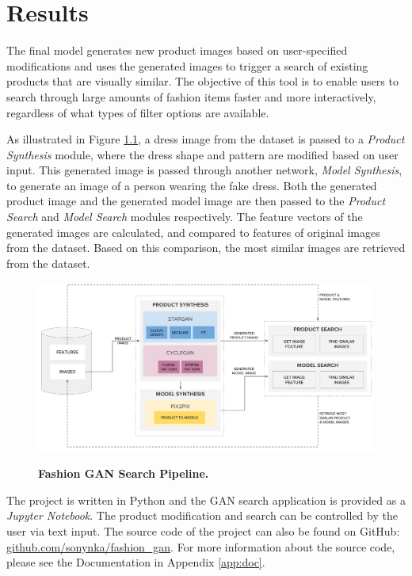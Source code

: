 \documentclass[12pt]{report}
\begin{document}
\chapter{Results}
The final model generates new product images based on user-specified modifications and uses the generated images to trigger a search of existing products that are visually similar. The objective of this tool is to enable users to search through large amounts of fashion items faster and more interactively, regardless of what types of filter options are available.

As illustrated in Figure \ref{fig:pipeline}, a dress image from the dataset is passed to a \textit{Product Synthesis} module, where the dress shape and pattern are modified based on user input. This generated image is passed through another network, \textit{Model Synthesis}, to generate an image of a person wearing the fake dress. Both the generated product image and the generated model image are then passed to the \textit{Product Search} and \textit{Model Search} modules respectively. The feature vectors of the generated images are calculated, and compared to features of original images from the dataset. Based on this comparison, the most similar images are retrieved from the dataset.

\vspace{0.5cm}
\begin{figure}[h]
\centering
{\includegraphics[width=\linewidth]{05_results/pipeline}}
\caption{\label{fig:pipeline} \textbf{Fashion GAN Search Pipeline.}}
\end{figure}

The project is written in Python and the GAN search application is provided as a \textit{Jupyter Notebook}. The product modification and search can be controlled by the user via text input. The source code of the project can also be found on GitHub: \linebreak \hyperlink{https://github.com/sonynka/fashion\_gan}{github.com/sonynka/fashion\_gan}. For more information about the source code, please see the Documentation in Appendix \ref{app:doc}.
\end{document}
